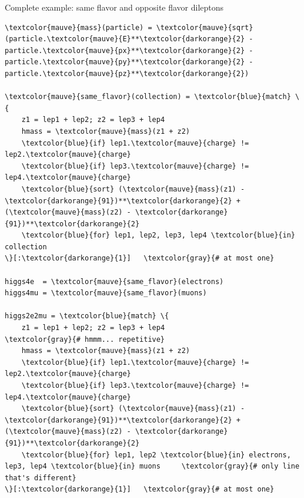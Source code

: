 \documentclass[aspectratio=169]{beamer}
\begin{document}
\begin{frame}[fragile]{Complete example: same flavor and opposite flavor dileptons}
\scriptsize
\vspace{0.25 cm}
\begin{Verbatim}[commandchars=\\\{\}]
\textcolor{mauve}{mass}(particle) = \textcolor{mauve}{sqrt}(particle.\textcolor{mauve}{E}**\textcolor{darkorange}{2} - particle.\textcolor{mauve}{px}**\textcolor{darkorange}{2} - particle.\textcolor{mauve}{py}**\textcolor{darkorange}{2} - particle.\textcolor{mauve}{pz}**\textcolor{darkorange}{2})

\textcolor{mauve}{same_flavor}(collection) = \textcolor{blue}{match} \{
    z1 = lep1 + lep2; z2 = lep3 + lep4
    hmass = \textcolor{mauve}{mass}(z1 + z2)
    \textcolor{blue}{if} lep1.\textcolor{mauve}{charge} != lep2.\textcolor{mauve}{charge}
    \textcolor{blue}{if} lep3.\textcolor{mauve}{charge} != lep4.\textcolor{mauve}{charge}
    \textcolor{blue}{sort} (\textcolor{mauve}{mass}(z1) - \textcolor{darkorange}{91})**\textcolor{darkorange}{2} + (\textcolor{mauve}{mass}(z2) - \textcolor{darkorange}{91})**\textcolor{darkorange}{2}
    \textcolor{blue}{for} lep1, lep2, lep3, lep4 \textcolor{blue}{in} collection
\}[:\textcolor{darkorange}{1}]   \textcolor{gray}{# at most one}

higgs4e  = \textcolor{mauve}{same_flavor}(electrons)
higgs4mu = \textcolor{mauve}{same_flavor}(muons)

higgs2e2mu = \textcolor{blue}{match} \{
    z1 = lep1 + lep2; z2 = lep3 + lep4                   \textcolor{gray}{# hmmm... repetitive}
    hmass = \textcolor{mauve}{mass}(z1 + z2)
    \textcolor{blue}{if} lep1.\textcolor{mauve}{charge} != lep2.\textcolor{mauve}{charge}
    \textcolor{blue}{if} lep3.\textcolor{mauve}{charge} != lep4.\textcolor{mauve}{charge}
    \textcolor{blue}{sort} (\textcolor{mauve}{mass}(z1) - \textcolor{darkorange}{91})**\textcolor{darkorange}{2} + (\textcolor{mauve}{mass}(z2) - \textcolor{darkorange}{91})**\textcolor{darkorange}{2}
    \textcolor{blue}{for} lep1, lep2 \textcolor{blue}{in} electrons, lep3, lep4 \textcolor{blue}{in} muons     \textcolor{gray}{# only line that's different}
\}[:\textcolor{darkorange}{1}]   \textcolor{gray}{# at most one}
\end{Verbatim}
\end{frame}
\end{document}
